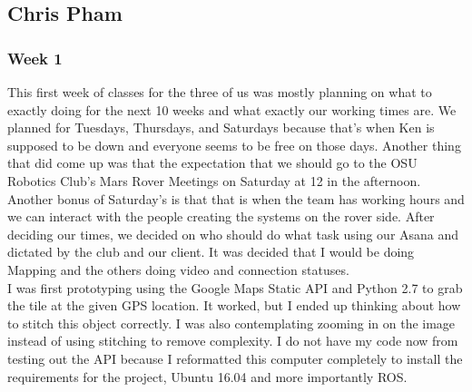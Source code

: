 \subsection{Chris Pham}
\subsubsection{Week 1}
This first week of classes for the three of us was mostly planning on what to exactly doing for the next 10 weeks and what exactly our working times are.
We planned for Tuesdays, Thursdays, and Saturdays because that's when Ken is supposed to be down and everyone seems to be free on those days.
Another thing that did come up was that the expectation that we should go to the OSU Robotics Club's Mars Rover Meetings on Saturday at 12 in the afternoon.
Another bonus of Saturday's is that that is when the team has working hours and we can interact with the people creating the systems on the rover side.
After deciding our times, we decided on who should do what task using our Asana and dictated by the club and our client.
It was decided that I would be doing Mapping and the others doing video and connection statuses.
\\
I was first prototyping using the Google Maps Static API and Python 2.7 to grab the tile at the given GPS location.
It worked, but I ended up thinking about how to stitch this object correctly.
I was also contemplating zooming in on the image instead of using stitching to remove complexity.
I do not have my code now from testing out the API because I reformatted this computer completely to install the requirements for the project, Ubuntu 16.04 and more importantly ROS.
